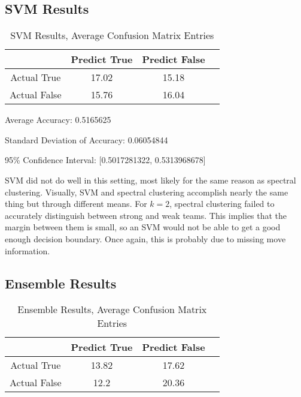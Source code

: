 \documentclass{acm_proc_article-sp}
\begin{document}
\subsection{SVM Results}

\begin{table}

\centering

\caption{SVM Results, Average Confusion Matrix Entries}

\begin{tabular}{|c|c|c|l|} \hline

 & Predict True & Predict False \\ \hline
Actual True & 17.02 & 15.18 \\ \hline
Actual False & 15.76 & 16.04 \\ \hline

\end{tabular}

\end{table}

Average Accuracy: 0.5165625

Standard Deviation of Accuracy: 0.06054844

95\% Confidence Interval: [0.5017281322, 0.5313968678]

SVM did not do well in this setting, most likely for the same reason as spectral clustering. Visually, SVM and spectral clustering accomplish nearly the same thing but through different means. For $k=2$, spectral clustering failed to accurately distinguish between strong and weak teams. This implies that the margin between them is small, so an SVM would not be able to get a good enough decision boundary. Once again, this is probably due to missing move information.

\subsection{Ensemble Results}

\begin{table}

\centering

\caption{Ensemble Results, Average Confusion Matrix Entries}

\begin{tabular}{|c|c|c|l|} \hline

 & Predict True & Predict False \\ \hline
Actual True & 13.82 & 17.62 \\ \hline
Actual False & 12.2 & 20.36 \\ \hline

\end{tabular}

\end{table}
\end{document}
